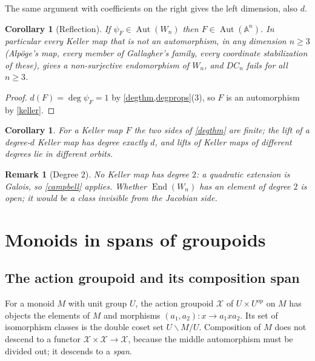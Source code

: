 \documentclass[11pt]{article}
\theoremstyle{change}
\newtheorem{cor}[equation]{Corollary}
\newtheorem{remark}[equation]{Remark}
\theoremstyle{nonumberplain}
\newtheorem{proof}{Proof}
\renewcommand\AA{{\mathbb A}}
\newcommand\cX{{\mathcal X}}
\DeclareMathOperator{\End}{End}
\DeclareMathOperator{\Aut}{Aut}
\begin{document}
The same argument with coefficients on the right gives the left dimension, also $d$.

\begin{cor}[Reflection\label{reflL}]
If $\psi_F \in \Aut(W_n)$ then $F \in \Aut(\AA^n)$. In particular every Keller map that is not an automorphism, in any dimension $n \geq 3$ (Alp\"oge's map, every member of Gallagher's family, every coordinate stabilization of these), gives a non-surjective endomorphism of $W_n$, and $DC_n$ fails for all $n \geq 3$.
\end{cor}

\begin{proof}
$d(F) = \deg \psi_F = 1$ by \cref{degthm,degprops}(3), so $F$ is an automorphism by \cref{keller}.
\end{proof}

\begin{cor}
For a Keller map $F$ the two sides of \cref{degthm} are finite; the lift of a degree-$d$ Keller map has degree exactly $d$, and lifts of Keller maps of different degrees lie in different orbits.
\end{cor}

\begin{remark}[Degree $2$]
No Keller map has degree $2$: a quadratic extension is Galois, so \cref{campbell} applies. Whether $\End(W_n)$ has an element of degree $2$ is open; it would be a class invisible from the Jacobian side.
\end{remark}

\section{Monoids in spans of groupoids\label{monoid}}

\subsection{The action groupoid and its composition span}

For a monoid $M$ with unit group $U$, the action groupoid $\cX$ of $U \times U^{op}$ on $M$ has objects the elements of $M$ and morphisms $(a_1, a_2) : x \to a_1 x a_2$. Its set of isomorphism classes is the double coset set $U \backslash M / U$. Composition of $M$ does not descend to a functor $\cX \times \cX \to \cX$, because the middle automorphism must be divided out; it descends to a \emph{span}.
\end{document}
